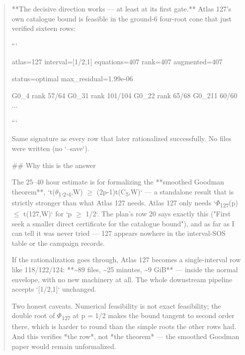\begin{quote}\small\ttfamily\raggedright
**The decisive direction works --- at least at its first gate.** Atlas 127's own catalogue bound is feasible in the ground-6 four-root cone that just verified sixteen rows:
\par
\medskip
```
\par
atlas=127 interval=[1/2,1] equations=407 rank=407 augmented=407
\par
status=optimal  max\_residual=1.99e-06
\par
G0\_4 rank 57/64   G0\_31 rank 101/104   G0\_22 rank 65/68   G0\_211 60/60 ...
\par
```
\par
\medskip
Same signature as every row that later rationalized successfully. No files were written (no `--save`).
\par
\medskip
\#\# Why this is the answer
\par
\medskip
The 25--40 hour estimate is for formalizing the **smoothed Goodman theorem**, `t(\(\theta\)\textsubscript{1},\textsubscript{2},\textsubscript{4},W) \(\geq\) (2p-1)t(C\textsubscript{5},W)` --- a standalone result that is strictly stronger than what Atlas 127 needs. Atlas 127 only needs `\(\Phi\)\textsubscript{1}\textsubscript{2}\textsubscript{7}(p) \(\leq\) t(127,W)` for `p \(\geq\) 1/2`. The plan's row 20 says exactly this ("First seek a smaller direct certificate for the catalogue bound"), and as far as I can tell it was never tried --- 127 appears nowhere in the interval-SOS table or the campaign records.
\par
\medskip
If the rationalization goes through, Atlas 127 becomes a single-interval row like 118/122/124: **\textasciitilde{}89 files, \textasciitilde{}25 minutes, \textasciitilde{}9 GiB** --- inside the normal envelope, with no new machinery at all. The whole downstream pipeline accepts `[1/2,1]` unchanged.
\par
\medskip
Two honest caveats. Numerical feasibility is not exact feasibility; the double root of \(\Phi\)\textsubscript{1}\textsubscript{2}\textsubscript{7} at p = 1/2 makes the bound tangent to second order there, which is harder to round than the simple roots the other rows had. And this verifies *the row*, not *the theorem* --- the smoothed Goodman paper would remain unformalized.
\par
\end{quote}

